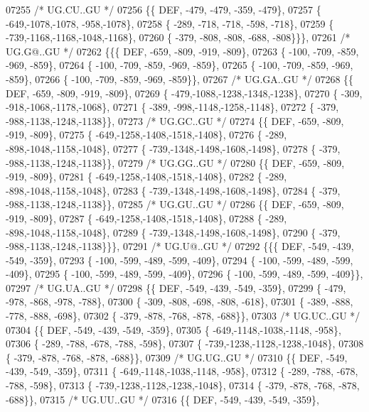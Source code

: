 \begin{DoxyCode}
07255 \textcolor{comment}{/* UG.CU..GU */}
07256 \{\{  DEF, -479, -479, -359, -479\},
07257 \{ -649,-1078,-1078, -958,-1078\},
07258 \{ -289, -718, -718, -598, -718\},
07259 \{ -739,-1168,-1168,-1048,-1168\},
07260 \{ -379, -808, -808, -688, -808\}\}\},
07261 \textcolor{comment}{/* UG.G@..GU */}
07262 \{\{\{  DEF, -659, -809, -919, -809\},
07263 \{ -100, -709, -859, -969, -859\},
07264 \{ -100, -709, -859, -969, -859\},
07265 \{ -100, -709, -859, -969, -859\},
07266 \{ -100, -709, -859, -969, -859\}\},
07267 \textcolor{comment}{/* UG.GA..GU */}
07268 \{\{  DEF, -659, -809, -919, -809\},
07269 \{ -479,-1088,-1238,-1348,-1238\},
07270 \{ -309, -918,-1068,-1178,-1068\},
07271 \{ -389, -998,-1148,-1258,-1148\},
07272 \{ -379, -988,-1138,-1248,-1138\}\},
07273 \textcolor{comment}{/* UG.GC..GU */}
07274 \{\{  DEF, -659, -809, -919, -809\},
07275 \{ -649,-1258,-1408,-1518,-1408\},
07276 \{ -289, -898,-1048,-1158,-1048\},
07277 \{ -739,-1348,-1498,-1608,-1498\},
07278 \{ -379, -988,-1138,-1248,-1138\}\},
07279 \textcolor{comment}{/* UG.GG..GU */}
07280 \{\{  DEF, -659, -809, -919, -809\},
07281 \{ -649,-1258,-1408,-1518,-1408\},
07282 \{ -289, -898,-1048,-1158,-1048\},
07283 \{ -739,-1348,-1498,-1608,-1498\},
07284 \{ -379, -988,-1138,-1248,-1138\}\},
07285 \textcolor{comment}{/* UG.GU..GU */}
07286 \{\{  DEF, -659, -809, -919, -809\},
07287 \{ -649,-1258,-1408,-1518,-1408\},
07288 \{ -289, -898,-1048,-1158,-1048\},
07289 \{ -739,-1348,-1498,-1608,-1498\},
07290 \{ -379, -988,-1138,-1248,-1138\}\}\},
07291 \textcolor{comment}{/* UG.U@..GU */}
07292 \{\{\{  DEF, -549, -439, -549, -359\},
07293 \{ -100, -599, -489, -599, -409\},
07294 \{ -100, -599, -489, -599, -409\},
07295 \{ -100, -599, -489, -599, -409\},
07296 \{ -100, -599, -489, -599, -409\}\},
07297 \textcolor{comment}{/* UG.UA..GU */}
07298 \{\{  DEF, -549, -439, -549, -359\},
07299 \{ -479, -978, -868, -978, -788\},
07300 \{ -309, -808, -698, -808, -618\},
07301 \{ -389, -888, -778, -888, -698\},
07302 \{ -379, -878, -768, -878, -688\}\},
07303 \textcolor{comment}{/* UG.UC..GU */}
07304 \{\{  DEF, -549, -439, -549, -359\},
07305 \{ -649,-1148,-1038,-1148, -958\},
07306 \{ -289, -788, -678, -788, -598\},
07307 \{ -739,-1238,-1128,-1238,-1048\},
07308 \{ -379, -878, -768, -878, -688\}\},
07309 \textcolor{comment}{/* UG.UG..GU */}
07310 \{\{  DEF, -549, -439, -549, -359\},
07311 \{ -649,-1148,-1038,-1148, -958\},
07312 \{ -289, -788, -678, -788, -598\},
07313 \{ -739,-1238,-1128,-1238,-1048\},
07314 \{ -379, -878, -768, -878, -688\}\},
07315 \textcolor{comment}{/* UG.UU..GU */}
07316 \{\{  DEF, -549, -439, -549, -359\},

\end{DoxyCode}
